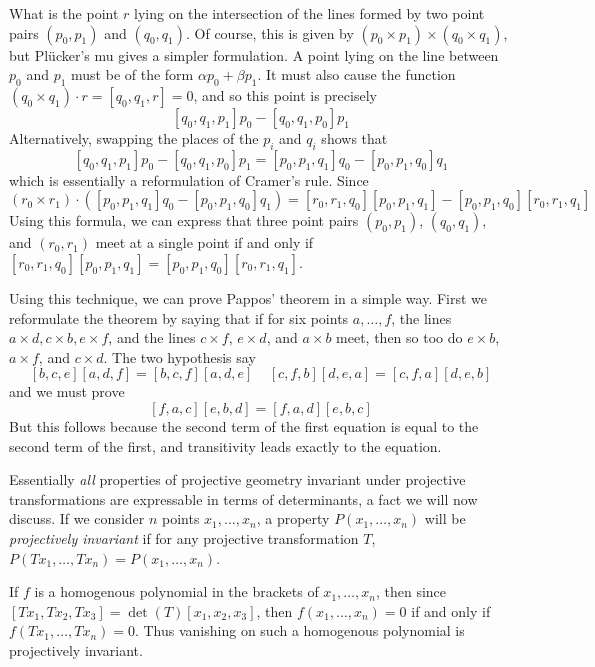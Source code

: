 \begin{example}
    What is the point $r$ lying on the intersection of the lines formed by two point pairs $(p_0,p_1)$ and $(q_0,q_1)$. Of course, this is given by $(p_0 \times p_1) \times (q_0 \times q_1)$, but Pl\"{u}cker's mu gives a simpler formulation. A point lying on the line between $p_0$ and $p_1$ must be of the form $\alpha p_0 + \beta p_1$. It must also cause the function $(q_0 \times q_1) \cdot r = [q_0,q_1,r] = 0$, and so this point is precisely
    \[ [q_0,q_1,p_1] p_0 - [q_0,q_1,p_0] p_1 \]
    Alternatively, swapping the places of the $p_i$ and $q_i$ shows that
    \[ [q_0,q_1,p_1] p_0 - [q_0,q_1,p_0] p_1 = [p_0,p_1,q_1] q_0 - [p_0,p_1,q_0] q_1 \]
    which is essentially a reformulation of Cramer's rule. Since
    \[ (r_0 \times r_1) \cdot ([p_0,p_1,q_1] q_0 - [p_0,p_1,q_0] q_1) = [r_0,r_1,q_0][p_0,p_1,q_1] - [p_0,p_1,q_0][r_0,r_1,q_1] \]
    Using this formula, we can express that three point pairs $(p_0,p_1)$, $(q_0,q_1)$, and $(r_0,r_1)$ meet at a single point if and only if $[r_0,r_1,q_0][p_0,p_1,q_1] = [p_0,p_1,q_0][r_0,r_1,q_1]$.
\end{example}

Using this technique, we can prove Pappos' theorem in a simple way. First we reformulate the theorem by saying that if for six points $a,\dots,f$, the lines $a \times d, c \times b, e \times f$, and the lines $c \times f$, $e \times d$, and $a \times b$ meet, then so too do $e \times b$, $a \times f$, and $c \times d$. The two hypothesis say
%
\[ [b,c,e][a,d,f] = [b,c,f][a,d,e]\ \ \ \ \ [c,f,b][d,e,a] = [c,f,a][d,e,b] \]
%
and we must prove
%
\[ [f,a,c][e,b,d] = [f,a,d][e,b,c] \]
%
But this follows because the second term of the first equation is equal to the second term of the first, and transitivity leads exactly to the equation.

Essentially {\it all} properties of projective geometry invariant under projective transformations are expressable in terms of determinants, a fact we will now discuss. If we consider $n$ points $x_1, \dots, x_n$, a property $P(x_1, \dots, x_n)$ will be {\it projectively invariant} if for any projective transformation $T$, $P(Tx_1, \dots, Tx_n) = P(x_1, \dots, x_n)$.

\begin{example}
    If $f$ is a homogenous polynomial in the brackets of $x_1, \dots, x_n$, then since $[Tx_1, Tx_2, Tx_3] = \det(T) [x_1, x_2, x_3]$, then $f(x_1, \dots, x_n) = 0$ if and only if $f(Tx_1, \dots, Tx_n) = 0$. Thus vanishing on such a homogenous polynomial is projectively invariant.
\end{example}

